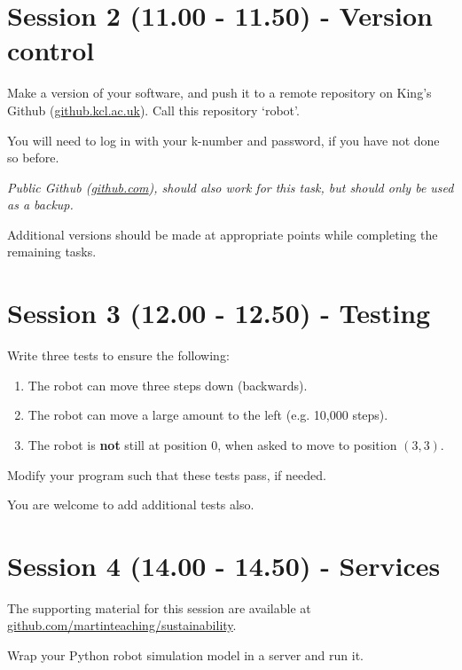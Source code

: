 \documentclass{article}
\begin{document}
\section{Session 2 (11.00 - 11.50) - Version control}

Make a version of your software, and push it to a remote repository on King's Github (\href{https://github.kcl.ac.uk/}{github.kcl.ac.uk}).
Call this repository `robot'.

You will need to log in with your k-number and password, if you have not done so before.

\textit{Public Github (\href{https://github.com}{github.com}), should
also work for this task, but should only be used as a backup.}

Additional versions should be made at appropriate points while completing the remaining tasks.

\section{Session 3 (12.00 - 12.50) - Testing}

Write three tests to ensure the following:

\begin{enumerate}

    \item The robot can move three steps down (backwards).

    \item The robot can move a large amount to the left (e.g. 10,000 steps).

    \item The robot is \textbf{not} still at position 0, when asked to move to position $(3, 3)$.

\end{enumerate}

Modify your program such that these tests pass, if needed.

You are welcome to add additional tests also.

\section{Session 4 (14.00 - 14.50) - Services}

The supporting material for this session are available at
\href{https://github.com/martinteaching/sustainability}{github.com/martinteaching/sustainability}.

Wrap your Python robot simulation model in a server and run it.
\end{document}
